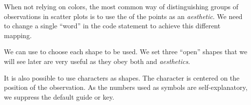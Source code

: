 \documentclass[krantz2]{krantz}\usepackage{knitr}
\begin{document}
When not relying on colors, the most common way of distinguishing groups of observations in scatter plots is to use the  of the points as an \emph{aesthetic}. We need to change a single ``word'' in the code statement to achieve this different mapping.

\begin{knitrout}\footnotesize
{}\color{fgcolor}\begin{kframe}
\begin{alltt}
\hlstd{(}  \hlstd{(}     \hlstd{=}  \hlopt{+}
  \hlstd{()}
\end{alltt}
\end{kframe}
\end{knitrout}

We can use  to choose each shape to be used. We set three ``open'' shapes that we will see later are very useful as they obey both  and  \emph{aesthetics}.\label{chunk:filled:symbols}

\begin{knitrout}\footnotesize
{}\color{fgcolor}\begin{kframe}
\begin{alltt}
\hlstd{(}  \hlstd{(}     \hlstd{=}  \hlopt{+}
  \hlstd{()} \hlopt{+}
  \hlstd{(} \hlstd{=} \hlstd{(}\hlstd{,} \hlstd{,} \hlstd{))}
\end{alltt}
\end{kframe}
\end{knitrout}

It is also possible to use characters as shapes. The character is centered on the position of the observation. As the numbers used as symbols are self-explanatory, we suppress the default guide or key.\label{chunk:plot:point:char}
\end{document}
